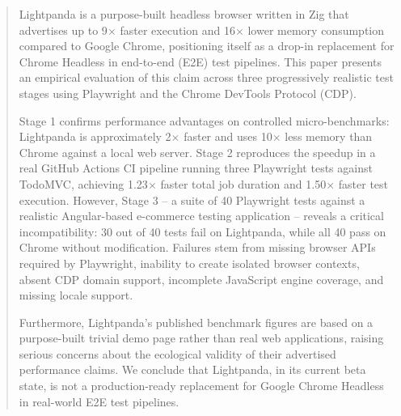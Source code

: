 \begin{abstract}

Lightpanda is a purpose-built headless browser written in Zig that advertises up to 9$\times$ faster execution and 16$\times$ lower memory consumption compared to Google Chrome, positioning itself as a drop-in replacement for Chrome Headless in end-to-end (E2E) test pipelines. This paper presents an empirical evaluation of this claim across three progressively realistic test stages using Playwright and the Chrome DevTools Protocol (CDP).

Stage 1 confirms performance advantages on controlled micro-benchmarks: Lightpanda is approximately 2$\times$ faster and uses 10$\times$ less memory than Chrome against a local web server. Stage 2 reproduces the speedup in a real GitHub Actions CI pipeline running three Playwright tests against TodoMVC, achieving 1.23$\times$ faster total job duration and 1.50$\times$ faster test execution. However, Stage 3 -- a suite of 40 Playwright tests against a realistic Angular-based e-commerce testing application -- reveals a critical incompatibility: 30 out of 40 tests fail on Lightpanda, while all 40 pass on Chrome without modification. Failures stem from missing browser APIs required by Playwright, inability to create isolated browser contexts, absent CDP domain support, incomplete JavaScript engine coverage, and missing locale support.

Furthermore, Lightpanda's published benchmark figures are based on a purpose-built trivial demo page rather than real web applications, raising serious concerns about the ecological validity of their advertised performance claims. We conclude that Lightpanda, in its current beta state, is not a production-ready replacement for Google Chrome Headless in real-world E2E test pipelines.

\end{abstract}
